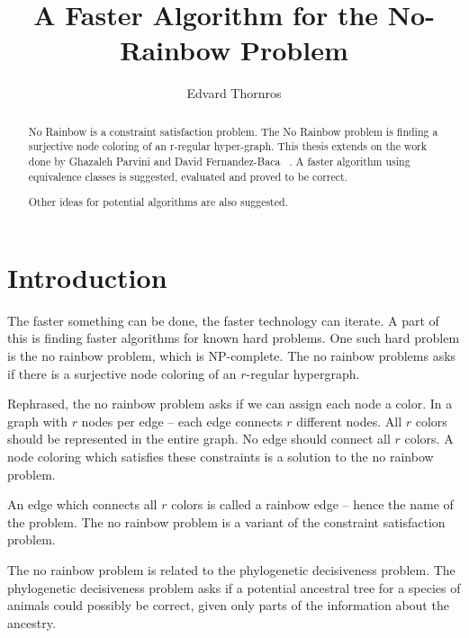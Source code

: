 \documentclass{report}
\title{A Faster Algorithm for the No-Rainbow Problem}
\author{Edvard Thornros}
\begin{document}
\maketitle

\begin{abstract}

No Rainbow is a constraint satisfaction problem.
The No Rainbow problem is finding a surjective node coloring of an r-regular hyper-graph.
This thesis extends on the work done by Ghazaleh Parvini and David Fernandez-Baca ~\cite{sourceNoRainbow}.
A faster algorithm using equivalence classes is suggested, evaluated and proved to be correct.

Other ideas for potential algorithms are also suggested.

\end{abstract}

\chapter{Introduction}
The faster something can be done, the faster technology can iterate.
A part of this is finding faster algorithms for known hard problems.
One such hard problem is the no rainbow problem, which is NP-complete.
The no rainbow problems asks if there is a surjective node coloring of an $r$-regular hypergraph.
\cite{sourceNoRainbow}

Rephrased, the no rainbow problem asks if we can assign each node a color.
In a graph with $r$ nodes per edge -- each edge connects $r$ different nodes.
All $r$ colors should be represented in the entire graph.
No edge should connect all $r$ colors.
A node coloring which satisfies these constraints is a solution to the no rainbow problem.

An edge which connects all $r$ colors is called a rainbow edge -- hence the name of the problem.
The no rainbow problem is a variant of the constraint satisfaction problem.

The no rainbow problem is related to the phylogenetic decisiveness problem. The phylogenetic decisiveness problem asks if a potential ancestral tree for a species of animals could possibly be correct, given only parts of the information about the ancestry. \cite{sourcePhylogeneticDecisiveness}
\end{document}
